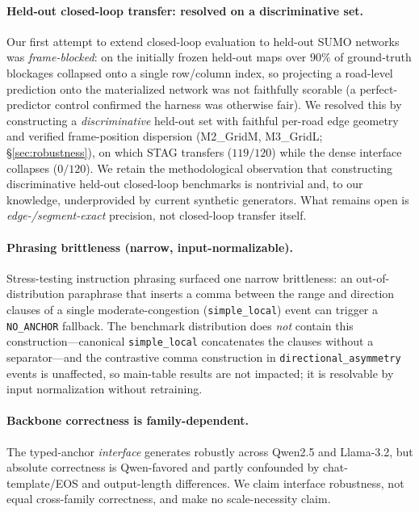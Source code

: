 \paragraph{Held-out closed-loop transfer: resolved on a discriminative set.}
Our first attempt to extend closed-loop evaluation to held-out SUMO networks was \emph{frame-blocked}:
on the initially frozen held-out maps over $90\%$ of ground-truth blockages collapsed onto a single
row/column index, so projecting a road-level prediction onto the materialized network was not faithfully
scorable (a perfect-predictor control confirmed the harness was otherwise fair). We resolved this by
constructing a \emph{discriminative} held-out set with faithful per-road edge geometry and verified
frame-position dispersion (M2\_GridM, M3\_GridL; \S\ref{sec:robustness}), on which STAG transfers
($119/120$) while the dense interface collapses ($0/120$). We retain the methodological observation that
constructing discriminative held-out closed-loop benchmarks is nontrivial and, to our knowledge,
underprovided by current synthetic generators. What remains open is \emph{edge-/segment-exact} precision,
not closed-loop transfer itself.

\paragraph{Phrasing brittleness (narrow, input-normalizable).}
Stress-testing instruction phrasing surfaced one narrow brittleness: an out-of-distribution paraphrase
that inserts a comma between the range and direction clauses of a single moderate-congestion
(\texttt{simple\_local}) event can trigger a \texttt{NO\_ANCHOR} fallback. The benchmark distribution does
\emph{not} contain this construction---canonical \texttt{simple\_local} concatenates the clauses without a
separator---and the contrastive comma construction in \texttt{directional\_asymmetry} events is
unaffected, so main-table results are not impacted; it is resolvable by input normalization without
retraining.

\paragraph{Backbone correctness is family-dependent.}
The typed-anchor \emph{interface} generates robustly across Qwen2.5 and Llama-3.2, but absolute
correctness is Qwen-favored and partly confounded by chat-template/EOS and output-length differences. We
claim interface robustness, not equal cross-family correctness, and make no scale-necessity claim.

